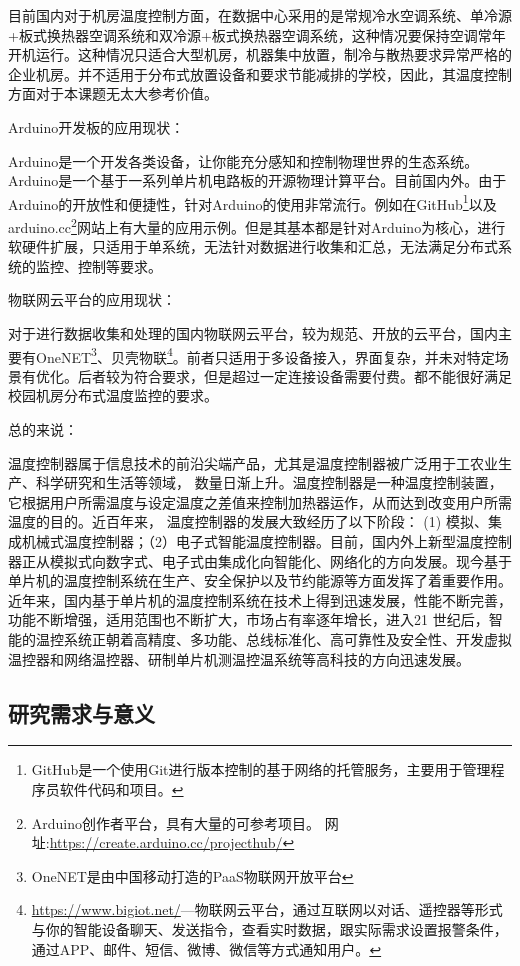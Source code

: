 目前国内对于机房温度控制方面，在数据中心采用的是常规冷水空调系统、单冷源+板式换热器空调系统和双冷源+板式换热器空调系统，这种情况要保持空调常年开机运行。这种情况只适合大型机房，机器集中放置，制冷与散热要求异常严格的企业机房。并不适用于分布式放置设备和要求节能减排的学校，因此，其温度控制方面对于本课题无太大参考价值。

Arduino开发板的应用现状：

Arduino是一个开发各类设备，让你能充分感知和控制物理世界的生态系统。Arduino是一个基于一系列单片机电路板的开源物理计算平台。目前国内外。由于Arduino的开放性和便捷性，针对Arduino的使用非常流行。例如在GitHub\footnote{GitHub是一个使用Git进行版本控制的基于网络的托管服务，主要用于管理程序员软件代码和项目。}以及arduino.cc\footnote{Arduino创作者平台，具有大量的可参考项目。 网址:\url{https://create.arduino.cc/projecthub/} }网站上有大量的应用示例。但是其基本都是针对Arduino为核心，进行软硬件扩展，只适用于单系统，无法针对数据进行收集和汇总，无法满足分布式系统的监控、控制等要求。

物联网云平台的应用现状：

对于进行数据收集和处理的国内物联网云平台，较为规范、开放的云平台，国内主要有OneNET\footnote{OneNET是由中国移动打造的PaaS物联网开放平台}、贝壳物联\footnote{\url{https://www.bigiot.net/}---物联网云平台，通过互联网以对话、遥控器等形式与你的智能设备聊天、发送指令，查看实时数据，跟实际需求设置报警条件，通过APP、邮件、短信、微博、微信等方式通知用户。}。前者只适用于多设备接入，界面复杂，并未对特定场景有优化。后者较为符合要求，但是超过一定连接设备需要付费。都不能很好满足校园机房分布式温度监控的要求。

总的来说：

温度控制器属于信息技术的前沿尖端产品，尤其是温度控制器被广泛用于工农业生产、科学研究和生活等领域， 数量日渐上升。温度控制器是一种温度控制装置，它根据用户所需温度与设定温度之差值来控制加热器运作，从而达到改变用户所需温度的目的。近百年来， 温度控制器的发展大致经历了以下阶段：
(1) 模拟、集成机械式温度控制器；（2）电子式智能温度控制器。目前，国内外上新型温度控制器正从模拟式向数字式、电子式由集成化向智能化、网络化的方向发展。现今基于单片机的温度控制系统在生产、安全保护以及节约能源等方面发挥了着重要作用。近年来，国内基于单片机的温度控制系统在技术上得到迅速发展，性能不断完善，功能不断增强，适用范围也不断扩大，市场占有率逐年增长，进入21 世纪后，智能的温控系统正朝着高精度、多功能、总线标准化、高可靠性及安全性、开发虚拟温控器和网络温控器、研制单片机测温控温系统等高科技的方向迅速发展。


\subsection{研究需求与意义}

